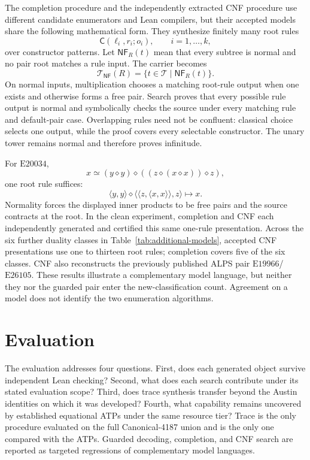 \documentclass[runningheads]{llncs}
\newcommand{\Law}[1]{\ensuremath{\mathrm{E}#1}}
\newcommand{\op}{\mathbin{\diamond}}
\newcommand{\Tree}{\mathcal{T}}
\newcommand{\Code}{\mathsf{C}}
\newcommand{\pair}[2]{\langle #1,#2\rangle}
\begin{document}
The completion procedure and the independently extracted CNF procedure
use different candidate enumerators and Lean compilers, but their accepted
models share the following mathematical form.  They synthesize finitely many
root rules
\[
  \Code(\ell_i,r_i;o_i),\qquad i=1,\ldots,k,
\]
over constructor patterns.  Let $\mathsf{NF}_R(t)$ mean that every subtree is
normal and no pair root matches a rule input.  The carrier becomes
\[
  \Tree_{\mathsf{NF}}(R)=\{t\in\Tree\mid\mathsf{NF}_R(t)\}.
\]
On normal inputs, multiplication chooses a matching root-rule output when one
exists and otherwise forms a free pair.  Search proves that every possible
rule output is normal and symbolically checks the source under every matching
rule and default-pair case.  Overlapping rules need not be confluent: classical choice selects
one output, while the proof covers every selectable constructor.  The unary
tower remains normal and therefore proves infinitude.

For \Law{20034},
\[
 x\simeq(y\op y)\op((z\op(x\op x))\op z),
\]
one root rule suffices:
\[
 \pair{y}{y}\op\pair{\pair{z}{\pair{x}{x}}}{z}\longmapsto x.
\]
Normality forces the displayed inner products to be free pairs and the source
contracts at the root.  In the clean experiment, completion and CNF each
independently generated and certified this same one-rule presentation.  Across
the six further duality classes in Table~\ref{tab:additional-models}, accepted
CNF presentations use one to thirteen root rules; completion covers five of
the six classes.  CNF also reconstructs the previously published ALPS pair
\Law{19966}/\Law{26105}.  These results illustrate a complementary model
language, but neither they nor the guarded pair enter the new-classification
count.  Agreement on a model does not identify the two enumeration algorithms.

\section{Evaluation}
\label{sec:evaluation}

The evaluation addresses four questions.  First, does each generated object
survive independent Lean checking?  Second, what does each search contribute
under its stated evaluation scope?  Third, does trace synthesis transfer beyond
the Austin identities on which it was developed?  Fourth, what capability
remains uncovered by established equational ATPs under the same resource tier?
Trace is the only procedure evaluated on the full Canonical-4187 union and is the only
one compared with the ATPs.  Guarded decoding, completion, and CNF search are
reported as targeted regressions of complementary model languages.
\end{document}
